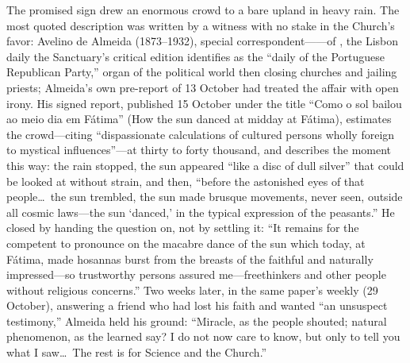 The promised sign drew an enormous crowd to a bare upland in heavy
rain. The most quoted description was written by a witness with no
stake in the Church's favor: Avelino de Almeida (1873--1932), special
correspondent------of , the
Lisbon daily the Sanctuary's critical edition identifies as the
``daily of the Portuguese Republican Party,'' organ of the political
world then closing churches and jailing priests; Almeida's own
pre-report of 13 October had treated the affair with open irony. His
signed report, published 15 October under the title ``Como o sol
bailou ao meio dia em F\'atima'' (How the sun danced at midday at
F\'atima), estimates the crowd---citing ``dispassionate calculations
of cultured persons wholly foreign to mystical influences''---at
thirty to forty thousand, and describes the moment this way: the rain
stopped, the sun appeared ``like a disc of dull silver'' that could be
looked at without strain, and then, ``before the astonished eyes of
that people\ldots\ the sun trembled, the sun made brusque movements,
never seen, outside all cosmic laws---the sun `danced,' in the typical
expression of the peasants.'' He closed by handing the question on, not by settling
it: ``It remains for the competent to pronounce on the macabre dance
of the sun which today, at F\'atima, made hosannas burst from the
breasts of the faithful and naturally impressed---so trustworthy
persons assured me---freethinkers and other people without religious
concerns.'' Two weeks later, in the same paper's weekly
 (29 October), answering a friend
who had lost his faith and wanted ``an unsuspect testimony,'' Almeida
held his ground: ``Miracle, as the people shouted; natural
phenomenon, as the learned say? I do not now care to know, but only
to tell you what I saw\ldots\ The rest is for Science and the
Church.''

